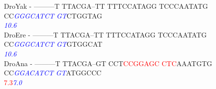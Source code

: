 \documentclass[11pt,twoside,reqno,a4paper]{article}
\begin{document}
{DroYak	-	---------T	TTACGA--TT	TTTCCATAGG	TCCCAATATG	CC\textit{\textcolor{Blue}{G}}\textit{\textcolor{Blue}{G}}\textit{\textcolor{Blue}{G}}\textit{\textcolor{Blue}{C}}\textit{\textcolor{Blue}{A}}\textit{\textcolor{Blue}{T}}\textit{\textcolor{Blue}{C}}\textit{\textcolor{Blue}{T}}	\textit{\textcolor{Blue}{G}}\textit{\textcolor{Blue}{T}}CTGGTAG\\
\hspace*{7\charwidth}\hspace*{1\charwidth}\hspace*{1\charwidth}\hspace*{1\charwidth}\hspace*{1\charwidth}\hspace*{1\charwidth}\hspace*{43\charwidth}\textit{\textcolor{Blue}{10.6}}\hspace*{1\charwidth}\\
DroEre	-	---------T	TTACGA--TT	TTTCCATAGG	TCCCAATATG	CC\textit{\textcolor{Blue}{G}}\textit{\textcolor{Blue}{G}}\textit{\textcolor{Blue}{G}}\textit{\textcolor{Blue}{C}}\textit{\textcolor{Blue}{A}}\textit{\textcolor{Blue}{T}}\textit{\textcolor{Blue}{C}}\textit{\textcolor{Blue}{T}}	\textit{\textcolor{Blue}{G}}\textit{\textcolor{Blue}{T}}GTGGCAT\\
\hspace*{7\charwidth}\hspace*{1\charwidth}\hspace*{1\charwidth}\hspace*{1\charwidth}\hspace*{1\charwidth}\hspace*{1\charwidth}\hspace*{43\charwidth}\textit{\textcolor{Blue}{10.6}}\hspace*{1\charwidth}\\
DroAna	-	---------T	TTACGA--GT	CCT\textcolor{Red}{C}\textcolor{Red}{C}\textcolor{Red}{G}\textcolor{Red}{G}\textcolor{Red}{A}\textcolor{Red}{G}\textcolor{Red}{C}	\textcolor{Red}{C}\textcolor{Red}{T}\textcolor{Red}{C}AAATGTG	CC\textit{\textcolor{Blue}{G}}\textit{\textcolor{Blue}{G}}\textit{\textcolor{Blue}{A}}\textit{\textcolor{Blue}{C}}\textit{\textcolor{Blue}{A}}\textit{\textcolor{Blue}{T}}\textit{\textcolor{Blue}{C}}\textit{\textcolor{Blue}{T}}	\textit{\textcolor{Blue}{G}}\textit{\textcolor{Blue}{T}}ATGGCCC\\
\hspace*{7\charwidth}\hspace*{1\charwidth}\hspace*{1\charwidth}\hspace*{1\charwidth}\hspace*{24\charwidth}\textcolor{Red}{7.3}\hspace*{1\charwidth}\hspace*{1\charwidth}\hspace*{16\charwidth}\textit{\textcolor{Blue}{7.0}}\hspace*{1\charwidth}\\
}
\end{document}
